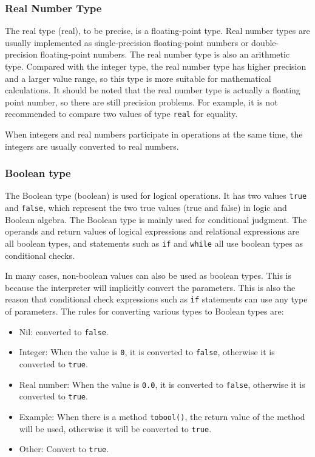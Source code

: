 \subsubsection {Real Number Type}

The real type (real), to be precise, is a floating-point type. Real number types are usually implemented as single-precision floating-point numbers or double-precision floating-point numbers. The real number type is also an arithmetic type. Compared with the integer type, the real number type has higher precision and a larger value range, so this type is more suitable for mathematical calculations. It should be noted that the real number type is actually a floating point number, so there are still precision problems. For example, it is not recommended to compare two values   of type \texttt{real} for equality.

When integers and real numbers participate in operations at the same time, the integers are usually converted to real numbers.

\subsubsection {Boolean type} \label{section::type_bool}

The Boolean type (boolean) is used for logical operations. It has two values   \texttt{true} and \texttt{false}, which represent the two true values   (true and false) in logic and Boolean algebra. The Boolean type is mainly used for conditional judgment. The operands and return values   of logical expressions and relational expressions are all boolean types, and statements such as \texttt{if} and \texttt{while} all use boolean types as conditional checks.

In many cases, non-boolean values   can also be used as boolean types. This is because the interpreter will implicitly convert the parameters. This is also the reason that conditional check expressions such as \texttt{if} statements can use any type of parameters. The rules for converting various types to Boolean types are:
\begin{itemize}
    \item Nil: converted to \texttt{false}.
    \item Integer: When the value is \texttt{0}, it is converted to \texttt{false}, otherwise it is converted to \texttt{true}.
    \item Real number: When the value is \texttt{0.0}, it is converted to \texttt{false}, otherwise it is converted to \texttt{true}.
    \item Example: When there is a method \texttt{tobool()}, the return value of the method will be used, otherwise it will be converted to \texttt{true}.
    \item Other: Convert to \texttt{true}.
\end{itemize}

